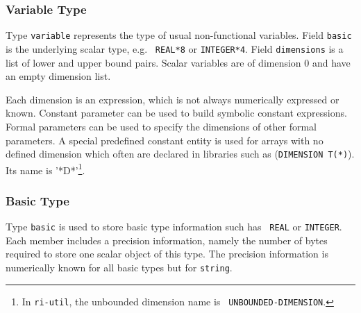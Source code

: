 \iffalse
L'ordre des de'clarations des variables est respecte', ce qui
permettrait de reproduire des programmes sources fide`les a` ce
qu'e'taient les programmes initiaux\footnote{Les de'clarations sont en
fait conserve'es sous forme textuelle pour garantir une fide'lite'
absolue.}.
\fi

\subsubsection{Variable Type}
\label{subsubsection-variable}


Type {\tt variable} represents the type of usual non-functional
variables. Field {\tt basic} is the underlying scalar type, e.g. {\tt
REAL*8} or {\tt INTEGER*4}. Field {\tt dimensions} is a list of lower
and upper bound pairs. Scalar variables are of dimension 0 and have an
empty dimension list.

\iffalse
Le domaine \verb/variable/ repre'sente le type d'une variable.  Le
sous-domaine \verb/basic/ donne le type Fortran de la variable.  Le
sous-domaine \verb/dimensions/ donne la liste des dimensions de la variable.
Un scalaire est un tableau de ze'ro dimension.
\fi

Each dimension is an expression, which is not always numerically
expressed or known. Constant parameter can be used to build symbolic
constant expressions. Formal parameters can be used to specify the
dimensions of other formal parameters. A special predefined constant
entity is used for arrays with no defined dimension which often are
declared in libraries such as (\verb/DIMENSION T(*)/). Its name is
'*D*'\footnote{In {\tt ri-util}, the unbounded dimension name is {\tt
UNBOUNDED-DIMENSION}.}.

\iffalse
Chaque dimension est une expression, qui n'est pas ne'cessairement
constante dans le cas des tableaux formels. La constante pre'de'finie de
nom '*D*' est utilise'e pour les tableaux de taille non de'finie
(\verb/DIMENSION T(*)/).
\fi

\subsubsection{Basic Type}
\label{subsubsection-basic}


Type {\tt basic} is used to store basic type information such has {\tt
REAL} or {\tt INTEGER}. Each member includes a precision information,
namely the number of bytes required to store one scalar object of this
type. The precision information is numerically known for all basic types
but for {\tt string}.

